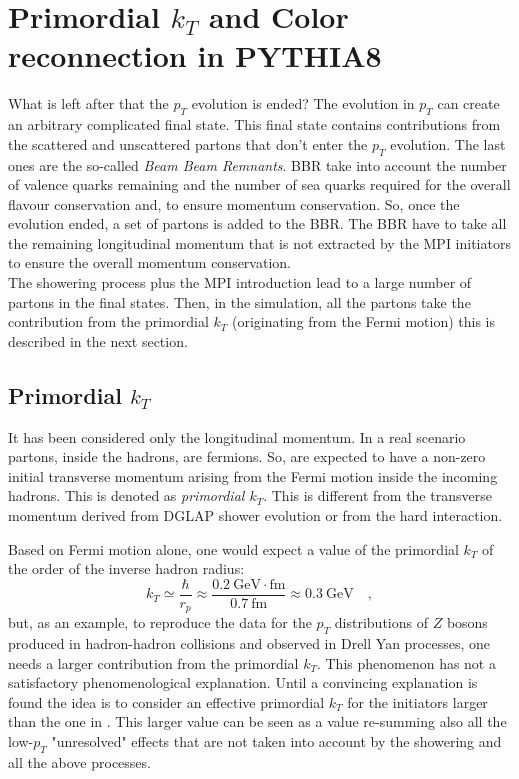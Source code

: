 \section{Primordial $k_T$ and Color reconnection in PYTHIA8}
\label{sec:Beam Beam Remnants and primordial kT}

What is left after that the $p_T$ evolution is ended?
The evolution in $p_T$ can create an arbitrary complicated final state. 
This final state contains contributions from the scattered and unscattered partons that don't enter the $p_T$ evolution. The last ones are the so-called \textit{Beam Beam Remnants}. 
BBR take into account the number of valence quarks remaining and the number of sea quarks required for the overall flavour conservation and, to ensure momentum conservation. So, once the evolution ended, a set of partons is added to the BBR. The BBR have to take all the remaining longitudinal momentum that is not extracted by the MPI initiators to ensure the overall momentum conservation.
\\
The showering process plus the MPI introduction lead to a large number of partons in the final states. Then, in the simulation, all the partons take the contribution from the primordial $k_T$ (originating from the Fermi motion) this is described in the next section.    

\subsection*{Primordial $k_T$}

It has been considered only the longitudinal momentum. In a real scenario partons, inside the hadrons, are fermions. So, are expected to have a non-zero initial transverse momentum arising from the Fermi motion inside the incoming hadrons. This is denoted as \textit{primordial $k_T$}. This is different from the transverse momentum derived from DGLAP shower evolution or from the hard interaction. 

\bigskip

\noindent Based on Fermi motion alone, one would expect a value of the primordial $k_T$ of the order of the inverse hadron radius: 
\begin{equation}
	k_T\simeq\frac{\hbar}{r_p}\approx\frac{0.2\ \mathrm{GeV\cdot fm}}{0.7\ \mathrm{fm}}\approx0.3\ \mathrm{GeV}\quad,
\label{eq:PrimordialKT}
\end{equation}
but, as an example, to reproduce the data for the $p_T$ distributions of $Z$ bosons produced in hadron-hadron collisions and observed in Drell Yan processes, one needs a larger contribution from the primordial $k_T$. This phenomenon has not a satisfactory phenomenological explanation. Until a convincing explanation is found the idea is to consider an effective primordial $k_T$ for the initiators larger than the one in . This larger value can be seen as a value re-summing also all the low-$p_T$ "unresolved" effects that are not taken into account by the showering and all the above processes.  


